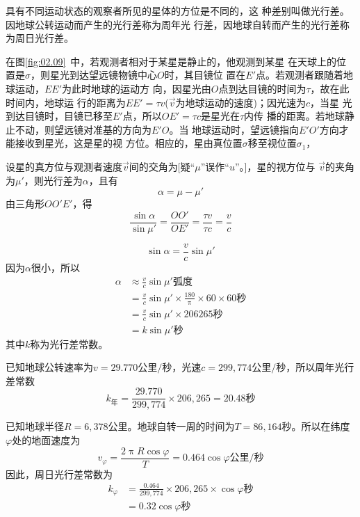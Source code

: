 具有不同运动状态的观察者所见的星体的方位是不同的，这
种差别叫做光行差。因地球公转运动而产生的光行差称为周年光
行差，因地球自转而产生的光行差称为周日光行差。

在图\ref{fig:02.09}~中，若观测者相对于某星是静止的，他观测到某星
在天球上的位置是$\sigma$，则星光到达望远镜物镜中心$O$时，其目镜位
置在$E'$点。若观测者跟随着地球运动，$EE'$为此时地球的运动方
向，因星光由$O$点到达目镜的时间为$\tau$，故在此时间内，地球运
行的距离为$EE'=\tau v$($\vec{v}$为地球运动的速度)；因光速为$c$，当星
光到达目镜时，目镜已移至$E'$点，所以$OE'=\tau c$是星光在$\tau$内传
播的距离。若地球静止不动，则望远镜对准基的方向为$E'O$。当
地球运动时，望远镜指向$E'O'$方向才能接收到星光，这是星的视
方位。相应的，星由真位置$\sigma$移至视位置$\sigma_1$，

设星的真方位与观测者速度$\vec{v}$间的交角为[疑“$\mu$”误作“$u$”。]，星的视方位与
$\vec{v}$的夹角为$\mu'$，则光行差为$\alpha$，且有
\begin{equation*}
    \alpha=\mu-\mu'
\end{equation*}
由三角形$OO'E'$，得
\begin{equation*}
    \frac{\sin\alpha}{\sin\mu'}=\frac{OO'}{OE'}=\frac{\tau v}{\tau c}=\frac{v}{c}
\end{equation*}

\begin{equation*}
    \sin\alpha=\frac{v}{c}\sin\mu'
\end{equation*}
因为$\alpha$很小，所以
\begin{align*}
    \alpha&\approx\frac{v}{c}\sin\mu'\text{弧度} \\
        &=\frac{v}{c}\sin\mu'\times\frac{180}{\uppi}\times 60 \times 60 \text{秒} \\
        &=\frac{v}{c}\sin\mu'\times 206265\text{秒} \\
        &=k\sin\mu'\text{秒}
\end{align*}
其中$k$称为光行差常数。

已知地球公转速率为$v=29.770\text{公里/秒}$，光速$c=299,774
\text{公里/秒}$，所以周年光行差常数
\begin{equation*}
    k_\text{年}=\frac{29.770}{299,774}\times 206,265=20.48\text{秒}
\end{equation*}

已知地球半径$R=6,378\text{公里}$。地球自转一周的时间为$T=
86,164\text{秒}$。所以在纬度$\varphi$处的地面速度为
\begin{equation*}
    v_\varphi=\frac{2\uppi R\cos\varphi}{T}=0.464\cos\varphi\text{公里/秒}
\end{equation*}
因此，周日光行差常数为
\begin{align*}
    k_\varphi&=\frac{0.464}{299,774}\times 206,265\times\cos\varphi\text{秒} \\
        &=0.32\cos\varphi\text{秒}
\end{align*}